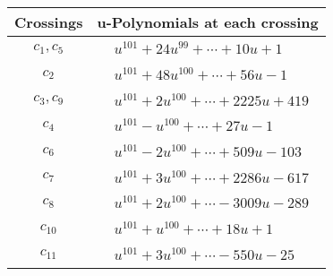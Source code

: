 \documentclass[1p]{elsarticle_modified}
\theoremstyle{definition}
\begin{document}
\begin{tabular}{m{50pt}|m{274pt}}
Crossings & \hspace{64pt}u-Polynomials at each crossing \\
\hline $$\begin{aligned}c_{1},c_{5}\end{aligned}$$&$\begin{aligned}
&u^{101}+24 u^{99}+\cdots+10 u+1
\end{aligned}$\\
\hline $$\begin{aligned}c_{2}\end{aligned}$$&$\begin{aligned}
&u^{101}+48 u^{100}+\cdots+56 u-1
\end{aligned}$\\
\hline $$\begin{aligned}c_{3},c_{9}\end{aligned}$$&$\begin{aligned}
&u^{101}+2 u^{100}+\cdots+2225 u+419
\end{aligned}$\\
\hline $$\begin{aligned}c_{4}\end{aligned}$$&$\begin{aligned}
&u^{101}- u^{100}+\cdots+27 u-1
\end{aligned}$\\
\hline $$\begin{aligned}c_{6}\end{aligned}$$&$\begin{aligned}
&u^{101}-2 u^{100}+\cdots+509 u-103
\end{aligned}$\\
\hline $$\begin{aligned}c_{7}\end{aligned}$$&$\begin{aligned}
&u^{101}+3 u^{100}+\cdots+2286 u-617
\end{aligned}$\\
\hline $$\begin{aligned}c_{8}\end{aligned}$$&$\begin{aligned}
&u^{101}+2 u^{100}+\cdots-3009 u-289
\end{aligned}$\\
\hline $$\begin{aligned}c_{10}\end{aligned}$$&$\begin{aligned}
&u^{101}+u^{100}+\cdots+18 u+1
\end{aligned}$\\
\hline $$\begin{aligned}c_{11}\end{aligned}$$&$\begin{aligned}
&u^{101}+3 u^{100}+\cdots-550 u-25
\end{aligned}$\\
\hline
\end{tabular}\\~\\
\end{document}
